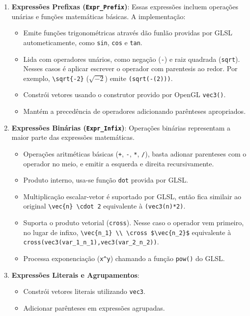 \begin{enumerate}
    \item \textbf{Expressões Prefixas (\texttt{Expr\_Prefix})}:
    Essas expressões incluem operações unárias e funções matemáticas básicas. A implementação:
    \begin{itemize}
        \item Emite funções trigonométricas através dão funlão providas por GLSL autometicamente, como \verb|sin|, \verb|cos| e \verb|tan|.
        \item Lida com operadores unários, como negação (\verb|-|) e raiz quadrada (\verb|sqrt|). Nesses casos é aplicar escrever o operador com parentesis ao redor. Por exemplo, \verb"\sqrt{-2}" ($\sqrt{-2}$) emite \verb"(sqrt(-(2)))".
        \item Constrói vetores usando o construtor provido por OpenGL \verb|vec3()|.
        \item Mantém a precedência de operadores adicionando parênteses apropriados.
    \end{itemize}

    \item \textbf{Expressões Binárias (\texttt{Expr\_Infix})}:
    Operações binárias representam a maior parte das expressões matemáticas.
    \begin{itemize}
        \item Operações aritméticas básicas (\verb|+|, \verb|-|, \verb|*|, \verb|/|), basta adionar parenteses com o operador no meio, e emitir a esquerda e direita recursivamente.
        \item Produto interno, usa-se função \verb|dot| provida por GLSL.
        \item Multiplicação escalar-vetor é suportado por GLSL, então fica similair ao original \verb"\vec{n} \cdot 2" equivalente à \verb"(vec3(n)*2)".
        \item Suporta o produto vetorial (\verb|cross|). Nesse caso o operador vem primeiro, no lugar de infixo, \verb"\vec{n_1} \\ \cross $\vec{n_2}$" equivalente à  \\ \verb"cross(vec3(var_1_n_1),vec3(var_2_n_2))".
        \item Processa exponenciação (\verb|x^y|) chamando a função \verb|pow()| do GLSL.
    \end{itemize}

    \item \textbf{Expressões Literais e Agrupamentos}:
    \begin{itemize}
        \item Constrói vetores literais utilizando \verb|vec3|.
        \item Adicionar parênteses em expressões agrupadas.
    \end{itemize}


\end{enumerate}
